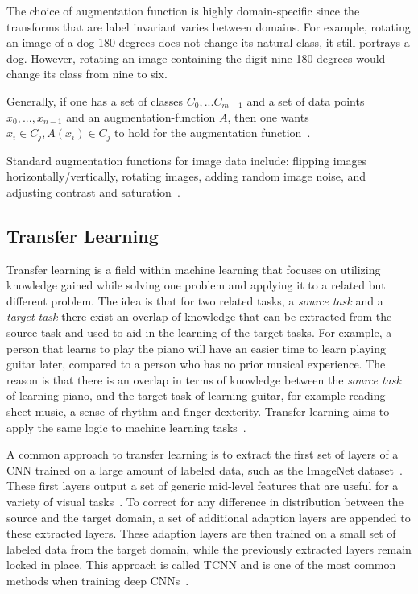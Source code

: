 The choice of augmentation function is highly domain-specific since the transforms that are label invariant varies between domains. For example, rotating an image of a dog 180 degrees does not change its natural class, it still portrays a dog. However, rotating an image containing the digit nine 180 degrees would change its class from nine to six. 

Generally, if one has a set of classes $C_0,...C_{m-1}$ and a set of data points $x_0,...,x_{n-1}$ and an augmentation-function $A$, then one wants $x_i \in C_j, A(x_i) \in C_j$ to hold for the augmentation function~\cite{deeplearningbook}.

Standard augmentation functions for image data include: flipping images horizontally/vertically, rotating images, adding random image noise, and adjusting contrast and saturation~\cite{deeplearningbook}.

\subsection{Transfer Learning}
Transfer learning is a field within machine learning that focuses on utilizing knowledge gained while solving one problem and applying it to a related but different problem. The idea is that for two related tasks, a \textit{source task} and a \textit{target task} there exist an overlap of knowledge that can be extracted from the source task and used to aid in the learning of the target tasks. For example, a person that learns to play the piano will have an easier time to learn playing guitar later, compared to a person who has no prior musical experience. The reason is that there is an overlap in terms of knowledge between the \textit{source task} of learning piano, and the target task of learning guitar, for example reading sheet music, a sense of rhythm and finger dexterity. Transfer learning aims to apply the same logic to machine learning tasks~\cite{transferlearning}.   

A common approach to transfer learning is to extract the first set of layers of a \gls{CNN} trained on a large amount of labeled data, such as the ImageNet dataset~\cite{imagenet}. These first layers output a set of generic mid-level features that are useful for a variety of visual tasks~\cite{cnn-features}. To correct for any difference in distribution between the source and the target domain, a set of additional adaption layers are appended to these extracted layers. These adaption layers are then trained on a small set of labeled data from the target domain, while the previously extracted layers remain locked in place. This approach is called \gls{TCNN} and is one of the most common methods when training deep \gls{CNN}s~\cite{transferlearning}.

